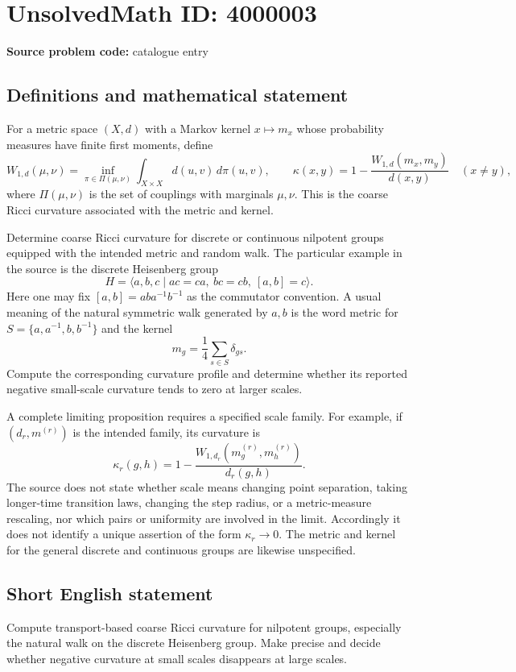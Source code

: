\documentclass[11pt]{article}
\begin{document}
\section*{UnsolvedMath ID: 4000003}
\textbf{Source problem code:} catalogue entry
\subsection{Definitions and mathematical statement}
For a metric space $(X,d)$ with a Markov kernel $x\mapsto m_x$ whose probability measures have finite first moments, define
\[
W_{1,d}(\mu,\nu)=\inf_{\pi\in\Pi(\mu,\nu)}\int_{X\times X}d(u,v)\,d\pi(u,v),\qquad
\kappa(x,y)=1-\frac{W_{1,d}(m_x,m_y)}{d(x,y)}\quad(x\ne y),
\]
where $\Pi(\mu,\nu)$ is the set of couplings with marginals $\mu,\nu$. This is the coarse Ricci curvature associated with the metric and kernel.

Determine coarse Ricci curvature for discrete or continuous nilpotent groups equipped with the intended metric and random walk. The particular example in the source is the discrete Heisenberg group
\[
H=\langle a,b,c\mid ac=ca,\ bc=cb,\ [a,b]=c\rangle.
\]
Here one may fix $[a,b]=aba^{-1}b^{-1}$ as the commutator convention. A usual meaning of the natural symmetric walk generated by $a,b$ is the word metric for $S=\{a,a^{-1},b,b^{-1}\}$ and the kernel
\[
m_g=\frac14\sum_{s\in S}\delta_{gs}.
\]
Compute the corresponding curvature profile and determine whether its reported negative small-scale curvature tends to zero at larger scales.

A complete limiting proposition requires a specified scale family. For example, if $(d_r,m^{(r)})$ is the intended family, its curvature is
\[
\kappa_r(g,h)=1-\frac{W_{1,d_r}(m^{(r)}_g,m^{(r)}_h)}{d_r(g,h)}.
\]
The source does not state whether scale means changing point separation, taking longer-time transition laws, changing the step radius, or a metric-measure rescaling, nor which pairs or uniformity are involved in the limit. Accordingly it does not identify a unique assertion of the form $\kappa_r\to0$. The metric and kernel for the general discrete and continuous groups are likewise unspecified.
\subsection{Short English statement}
Compute transport-based coarse Ricci curvature for nilpotent groups, especially the natural walk on the discrete Heisenberg group. Make precise and decide whether negative curvature at small scales disappears at large scales.
\end{document}
